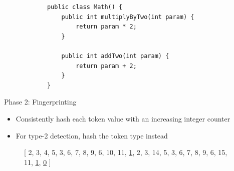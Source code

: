 \documentclass[aspectratio=1610, xcolor=table]{beamer}
\begin{document}
	\newsavebox{\firstlisting}
	\begin{lrbox}{\firstlisting}
        \begin{lstlisting}
            public class Math() {
                public int multiplyByTwo(int param) {
                    return param * 2;
                }

                public int addTwo(int param) {
                    return param + 2;
                }
            }
        \end{lstlisting}
	\end{lrbox}
\begin{frame}[fragile]{Phase 2: Fingerprinting}
    \begin{itemize}
        \item Consistently hash each token value with an increasing integer counter
        \item For type-2 detection, hash the token type instead
    \end{itemize}
	\begin{figure}
		\begin{center}
            \scalebox{.75}{\usebox{\firstlisting}}
                \hspace{.5cm}
            \vspace{.5cm}

            [ 2, 3, 4, 5, 3, 6, 7, 8, 9, 6, 10, 11, \underline{1}, 2, 3, 14, 5, 3, 6, 7,
                    8, 9, 6, 15, 11, \underline{1}, \underline{0} ]
		\end{center}
		\label{fig:fingerprint}
	\end{figure}
\end{frame}
\end{document}
